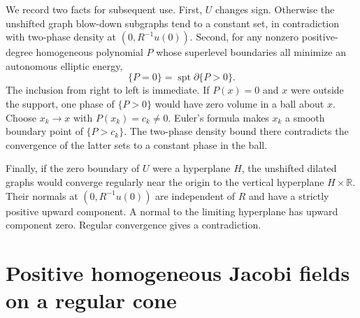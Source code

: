 \documentclass[11pt]{amsart}
\begin{document}
We record two facts for subsequent use. First, \(U\) changes sign.
Otherwise the unshifted graph blow-down subgraphs tend to a constant
set, in contradiction with two-phase density at \((0,R^{-1}u(0))\).
Second, for any nonzero positive-degree homogeneous polynomial \(P\)
whose superlevel boundaries all minimize an autonomous elliptic energy,
\begin{equation}\label{eq:zeros}
 \{P=0\}=\operatorname{spt}\partial\{P>0\}.
\end{equation}
The inclusion from right to left is immediate. If \(P(x)=0\) and \(x\)
were outside the support, one phase of \(\{P>0\}\) would have zero volume
in a ball about \(x\). Choose \(x_k\to x\) with \(P(x_k)=c_k\ne0\).
Euler's formula makes \(x_k\) a smooth boundary point of
\(\{P>c_k\}\). The two-phase density bound there contradicts the
convergence of the latter sets to a constant phase in the ball.

Finally, if the zero boundary of \(U\) were a hyperplane \(H\), the
unshifted dilated graphs would converge regularly near the origin to
the vertical hyperplane \(H\times\mathbb R\). Their normals at
\((0,R^{-1}u(0))\) are independent of \(R\) and have a strictly positive
upward component. A normal to the limiting hyperplane has upward
component zero. Regular convergence gives a contradiction.

\section{Positive homogeneous Jacobi fields on a regular cone}\label{sec:exponents}
\end{document}
